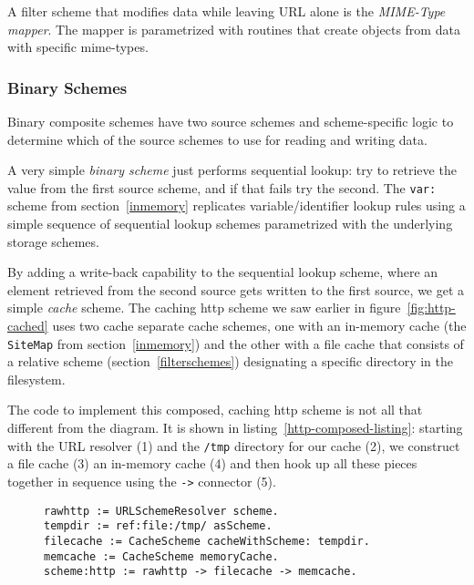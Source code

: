 \documentclass[preprint,authoryear]{llncs}
\begin{document}
A filter scheme that modifies data while leaving URL alone is the \emph{MIME-Type mapper}.
The mapper is parametrized with routines that create objects from data with specific
mime-types.  


\subsubsection{Binary Schemes}

Binary composite schemes have two source schemes and scheme-specific logic
to determine which of the source schemes to use for reading and writing data.

A very simple \emph{binary scheme} just performs sequential lookup:  try to
retrieve the value from the first source scheme, and if that fails try the second.
The {\tt var:} scheme from section~\ref{inmemory}  replicates variable/identifier
lookup rules using a simple sequence of sequential lookup schemes parametrized
with the underlying storage schemes.

By adding a write-back capability to the sequential lookup scheme, where an element
retrieved from the second source gets written to the first source, we get a simple \emph{cache} scheme.  
The caching http scheme we saw earlier in figure~\ref{fig:http-cached} uses two cache
separate cache schemes, one with an in-memory cache (the {\tt SiteMap} from section~\ref{inmemory})
and the other with a file cache that consists of a relative scheme (section~\ref{filterschemes}) 
designating a specific directory in the filesystem.

The code to implement this composed, caching http scheme is not all 
that different from the diagram.  It is shown in listing~\ref{http-composed-listing}:  
starting with the URL resolver (1) and the {\tt /tmp} directory for our cache (2), we construct
a file cache (3) an in-memory cache (4) and then hook up all these pieces together
in sequence using the {\tt ->} connector (5).

\begin{figure}[htbp]
\begin{lstlisting}[style=numbers,label=http-composed-listing,caption=Code for caching http stack.]
rawhttp := URLSchemeResolver scheme.
tempdir := ref:file:/tmp/ asScheme.
filecache := CacheScheme cacheWithScheme: tempdir.
memcache := CacheScheme memoryCache.
scheme:http := rawhttp -> filecache -> memcache.
\end{lstlisting}
\end{figure}
\end{document}
